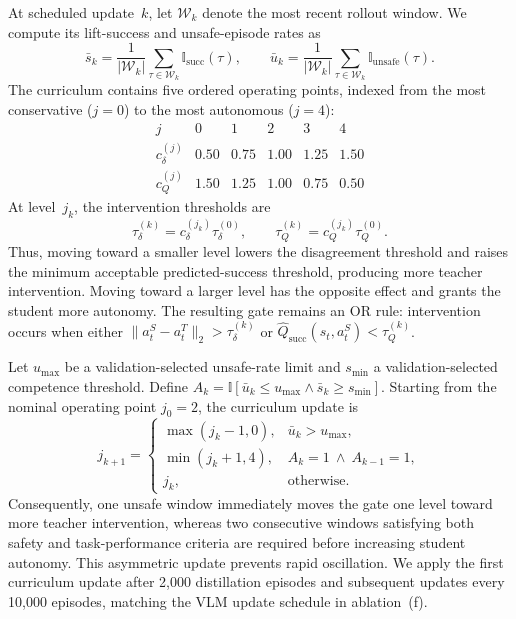 At scheduled update~$k$, let $\mathcal W_k$ denote the most recent rollout
window. We compute its lift-success and unsafe-episode rates as
\begin{equation}
\bar s_k=\frac{1}{|\mathcal W_k|}\sum_{\tau\in\mathcal W_k}
\mathbb I_{\mathrm{succ}}(\tau),\qquad
\bar u_k=\frac{1}{|\mathcal W_k|}\sum_{\tau\in\mathcal W_k}
\mathbb I_{\mathrm{unsafe}}(\tau).
\label{eq:curriculum_window_metrics}
\end{equation}
The curriculum contains five ordered operating points, indexed from the most
conservative ($j=0$) to the most autonomous ($j=4$):
\begin{equation}
\begin{array}{c|ccccc}
j                         & 0    & 1    & 2    & 3    & 4 \\ \hline
c_{\delta}^{(j)}           & 0.50 & 0.75 & 1.00 & 1.25 & 1.50 \\
c_{Q}^{(j)}                & 1.50 & 1.25 & 1.00 & 0.75 & 0.50
\end{array}
\label{eq:curriculum_levels}
\end{equation}
At level~$j_k$, the intervention thresholds are
\begin{equation}
\tau_{\delta}^{(k)}=c_{\delta}^{(j_k)}\tau_{\delta}^{(0)},
\qquad
\tau_{Q}^{(k)}=c_{Q}^{(j_k)}\tau_{Q}^{(0)}.
\label{eq:curriculum_thresholds}
\end{equation}
Thus, moving toward a smaller level lowers the disagreement threshold and
raises the minimum acceptable predicted-success threshold, producing more
teacher intervention. Moving toward a larger level has the opposite effect and
grants the student more autonomy. The resulting gate remains an OR rule:
intervention occurs when either
$\lVert a_t^S-a_t^T\rVert_2>\tau_{\delta}^{(k)}$ or
$\hat Q_{\mathrm{succ}}(s_t,a_t^S)<\tau_Q^{(k)}$.

Let $u_{\max}$ be a validation-selected unsafe-rate limit and $s_{\min}$ a
validation-selected competence threshold. Define
$A_k=\mathbb I[\bar u_k\leq u_{\max}\land\bar s_k\geq s_{\min}]$.
Starting from the nominal operating point $j_0=2$, the curriculum update is
\begin{equation}
j_{k+1}=
\begin{cases}
\max(j_k-1,0), & \bar u_k>u_{\max},\\
\min(j_k+1,4), & A_k=1\ \land\ A_{k-1}=1,\\
j_k,           & \text{otherwise}.
\end{cases}
\label{eq:curriculum_update}
\end{equation}
Consequently, one unsafe window immediately moves the gate one level toward
more teacher intervention, whereas two consecutive windows satisfying both
safety and task-performance criteria are required before increasing student
autonomy. This asymmetric update prevents rapid oscillation. We apply the first
curriculum update after 2{,}000 distillation episodes and subsequent updates
every 10{,}000 episodes, matching the VLM update schedule in ablation~(f).
